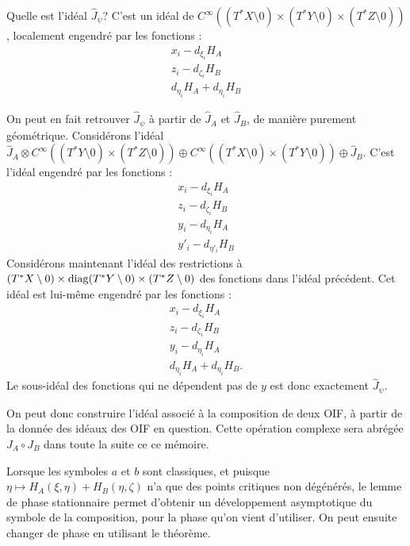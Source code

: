 Quelle est l'idéal $\widehat{J}_{\psi}$? C'est un idéal de $C^{\infty}((T^*X \setminus 0)\times (T^*Y \setminus 0)\times (T^*Z \setminus 0) )$, localement engendré par les fonctions :
\begin{align*}
	x_i-d_{\xi_i}H_A\\
	z_i-d_{\zeta_i}H_B\\
	d_{\eta_i}H_A+d_{\eta_i}H_B
\end{align*}

On peut en fait retrouver $\widehat{J}_{\psi}$ à partir de $\widehat{J}_A$ et $\widehat{J}_B$, de manière purement géométrique. Considérons l'idéal $\widehat{J}_A \otimes C^{\infty}((T^*Y\setminus 0)\times (T^*Z\setminus 0)) \oplus C^{\infty}((T^*X\setminus 0)\times (T^*Y\setminus 0)) \oplus \widehat{J}_B$. C'est l'idéal engendré par les fonctions :
\begin{align*}
	x_i-d_{\xi_i}H_A\\
	z_i-d_{\zeta_i}H_B\\
	y_i-d_{\eta_i}H_A\\
	y'_i - d_{\eta'_i}H_B
\end{align*}
Considérons maintenant l'idéal des restrictions à $(T^*X\setminus 0)\times \operatorname{diag} (T^*Y\setminus 0) \times (T^*Z\setminus 0)$ des fonctions dans l'idéal précédent. Cet idéal est lui-même engendré par les fonctions :
\begin{align*}
x_i-d_{\xi_i}H_A\\
z_i-d_{\zeta_i}H_B\\
y_i-d_{\eta_i}H_A\\
d_{\eta_i}H_A+ d_{\eta_i}H_B.
\end{align*}
Le sous-idéal des fonctions qui ne dépendent pas de $y$ est donc exactement $\widehat{J}_{\psi}$.

On peut donc construire l'idéal associé à la composition de deux OIF, à partir de la donnée des idéaux des OIF en question. Cette opération complexe sera abrégée $J_A\circ J_B$ dans toute la suite ce ce mémoire.

\begin{rem}
	Lorsque les symboles $a$ et $b$ sont classiques, et puisque $\eta \mapsto H_A(\xi,\eta)+H_B(\eta,\zeta)$ n'a que des points critiques non dégénérés, le lemme de phase stationnaire permet d'obtenir un développement asymptotique du symbole de la composition, pour la phase qu'on vient d'utiliser. On peut ensuite changer de phase en utilisant le théorème.
\end{rem}

